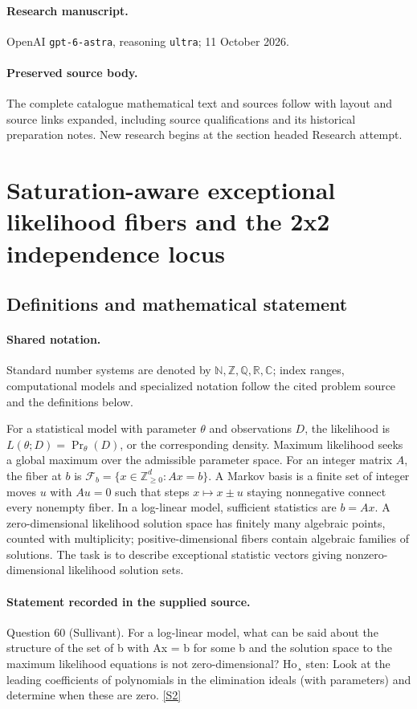 \documentclass[11pt]{article}
\begin{document}
\paragraph{Research manuscript.} OpenAI \texttt{gpt-6-astra}, reasoning \texttt{ultra}; 11 October 2026.
\paragraph{Preserved source body.} The complete catalogue mathematical text and sources follow with layout and source links expanded, including source qualifications and its historical preparation notes. New research begins at the section headed Research attempt.

\section{Saturation-aware exceptional likelihood fibers and the 2x2 independence locus}\label{statement}

\subsection{Definitions and mathematical statement}

\paragraph{Shared notation.}Standard number systems are denoted by $\mathbb N,\mathbb Z,\mathbb Q,\mathbb R,\mathbb C$; index ranges, computational models and specialized notation follow the cited problem source and the definitions below.


For a statistical model with parameter $\theta$ and observations $D$, the likelihood is $L(\theta;D)=\Pr_\theta(D)$, or the corresponding density. Maximum likelihood seeks a global maximum over the admissible parameter space. For an integer matrix $A$, the fiber at $b$ is $\mathcal F_b=\{x\in\mathbb Z_{\ge0}^d:Ax=b\}$. A Markov basis is a finite set of integer moves $u$ with $Au=0$ such that steps $x\mapsto x\pm u$ staying nonnegative connect every nonempty fiber. In a log-linear model, sufficient statistics are $b=Ax$. A zero-dimensional likelihood solution space has finitely many algebraic points, counted with multiplicity; positive-dimensional fibers contain algebraic families of solutions. The task is to describe exceptional statistic vectors giving nonzero-dimensional likelihood solution sets.
\paragraph{Statement recorded in the supplied source.}
Question 60 (Sullivant). For a log-linear model, what can be said about the structure of the set of b with Ax = b for some b and the solution space to the maximum likelihood equations is not zero-dimensional? Ho¸ sten: Look at the leading coefficients of polynomials in the elimination ideals (with parameters) and determine when these are zero. \href{https://aimath.org/WWN/compalgstat/compalgstat.pdf}{[S2]}
\end{document}
